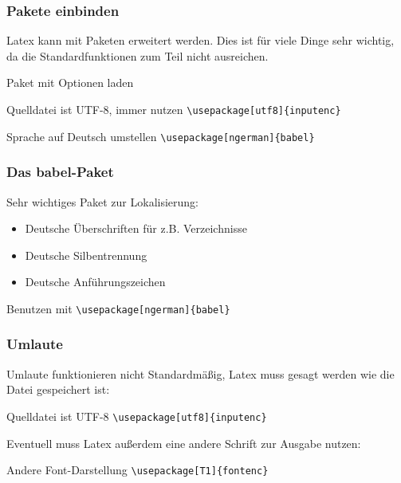 \begin{frame}[fragile]
    \frametitle{Pakete einbinden}
    
    Latex kann mit Paketen erweitert werden. Dies ist für viele Dinge sehr wichtig, da die Standardfunktionen zum Teil nicht ausreichen.
    \begin{block}{Paket mit Optionen laden}
    \end{block}
    \pause
    \bigskip
    \begin{exampleblock}{Quelldatei ist UTF-8, immer nutzen}
		\verb+\usepackage[utf8]{inputenc}+
    \end{exampleblock}
    \pause
    \begin{exampleblock}{Sprache auf Deutsch umstellen}
        \verb+\usepackage[ngerman]{babel}+
    \end{exampleblock}
\end{frame}


\begin{frame}[fragile]
    \frametitle{Das babel-Paket}
    
    Sehr wichtiges Paket zur Lokalisierung:
    \begin{itemize}
        \item Deutsche Überschriften für z.B. Verzeichnisse
        \item Deutsche Silbentrennung
        \item Deutsche Anführungszeichen
    \end{itemize}
    \bigskip
    \begin{block}{Benutzen mit}
        \verb+\usepackage[ngerman]{babel}+
    \end{block}
\end{frame}


\begin{frame}[fragile]
    \frametitle{Umlaute}
    
    Umlaute funktionieren nicht Standardmäßig, Latex muss gesagt werden wie die Datei gespeichert ist:
    \begin{block}{Quelldatei ist UTF-8}
		\verb+\usepackage[utf8]{inputenc}+
    \end{block}
    \pause
    
    Eventuell muss Latex außerdem eine andere Schrift zur Ausgabe nutzen:
    \begin{block}{Andere Font-Darstellung}
		\verb+\usepackage[T1]{fontenc}+
    \end{block}
\end{frame}


